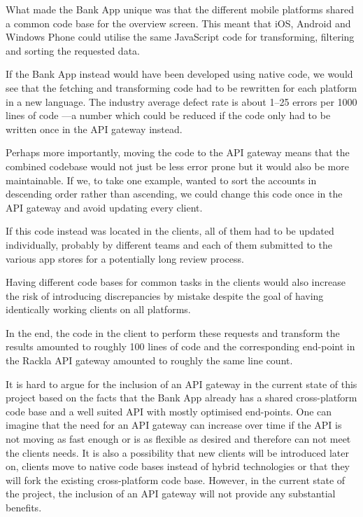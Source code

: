 \documentclass{cslthse-msc}
\begin{document}
What made the Bank App unique was that the different mobile platforms shared a common code base for the overview screen. This meant that iOS, Android and Windows Phone could utilise the same JavaScript code for transforming, filtering and sorting the requested data.

If the Bank App instead would have been developed using native code, we would see that the fetching and transforming code had to be rewritten for each platform in a new language. The industry average defect rate is about 1--25 errors per 1000 lines of code \cite[page 521]{code_complete}---a number which could be reduced if the code only had to be written once in the API gateway instead.

Perhaps more importantly, moving the code to the API gateway means that the combined codebase would not just be less error prone but it would also be more maintainable. If we, to take one example, wanted to sort the accounts in descending order rather than ascending, we could change this code once in the API gateway and avoid updating every client. 

If this code instead was located in the clients, all of them had to be updated individually, probably by different teams and each of them submitted to the various app stores for a potentially long review process.

Having different code bases for common tasks in the clients would also increase the risk of introducing discrepancies by mistake despite the goal of having identically working clients on all platforms.

In the end, the code in the client to perform these requests and transform the results amounted to roughly 100 lines of code and the corresponding end-point in the Rackla API gateway amounted to roughly the same line count.

It is hard to argue for the inclusion of an API gateway in the current state of this project based on the facts that the Bank App already has a shared cross-platform code base and a well suited API with mostly optimised end-points. One can imagine that the need for an API gateway can increase over time if the API is not moving as fast enough or is as flexible as desired and therefore can not meet the clients needs. It is also a possibility that new clients will be introduced later on, clients move to native code bases instead of hybrid technologies or that they will fork the existing cross-platform code base. However, in the current state of the project, the inclusion of an API gateway will not provide any substantial benefits.
\end{document}
